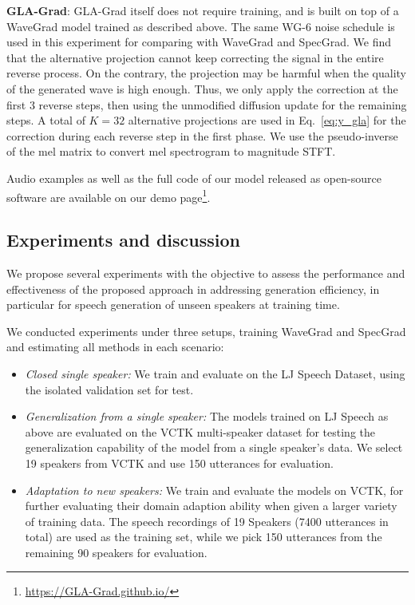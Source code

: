 \textbf{GLA-Grad}: GLA-Grad itself does not require training, and is built on top of a WaveGrad model trained as described above. The same WG-6 noise schedule %
is used in this experiment for comparing with WaveGrad and SpecGrad. We find that the alternative projection cannot keep correcting the signal in the entire reverse process. On the contrary, the projection may be harmful when the quality of the generated wave is high enough. Thus, we only apply the correction at the first $3$ reverse steps, then using the unmodified diffusion update for the remaining steps.
A total of $K=32$ alternative projections are used in Eq.~\ref{eq:y_gla}  for the correction during each reverse step in the first phase.  %
We use the pseudo-inverse of the mel matrix to convert mel spectrogram to magnitude STFT.

Audio examples as well as the full code of our model released as open-source software are available on our demo page\footnote{\url{https://GLA-Grad.github.io/}}.
 
\subsection{Experiments and discussion}

We propose several experiments %
with the objective to assess the performance and effectiveness of the proposed approach in addressing generation efficiency, in particular for speech generation of unseen speakers at training time. 

\noindent We conducted experiments under three setups, training WaveGrad and SpecGrad and estimating all methods in each scenario:
\begin{itemize}
    \item \textit{Closed single speaker:} We train and evaluate on the LJ Speech Dataset, using the isolated validation set for test. 
    \item \textit{Generalization from a single speaker:} The models trained on LJ Speech as above are evaluated on the VCTK multi-speaker dataset for testing the generalization capability of the model from a single speaker's data. We select 19 speakers from VCTK and use 150 utterances for evaluation.
    \item \textit{Adaptation to new speakers:} We train and evaluate the models on VCTK, for further evaluating their domain adaption ability when given a larger variety of training data. The speech recordings of 19 Speakers (7400 utterances in total) are used as the training set, while we pick 150 utterances from the remaining 90 speakers for evaluation.
\end{itemize}

